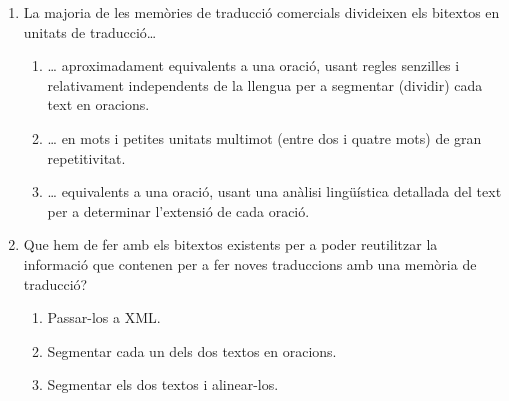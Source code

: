 \begin{enumerate}
\item La majoria de les memòries de traducció comercials divideixen
      els bitextos en unitats de traducció{\ldots}
   
\begin{enumerate}
\item {\ldots} aproximadament equivalents a una oració, usant
      regles senzilles i relativament independents de la llengua per a
      segmentar (dividir) cada text en oracions.
\item {\ldots} en mots i petites unitats multimot (entre dos i
      quatre mots) de gran repetitivitat.
\item {\ldots} equivalents a una oració, usant una anàlisi
      lingüística detallada del
      text per a determinar l'extensió de cada oració.
\end{enumerate}
\item Que hem de fer amb els bitextos existents per a poder reutilitzar la
   informació que contenen per a fer noves traduccions amb una memòria
   de traducció?
   
\begin{enumerate}
\item Passar-los a XML.
\item Segmentar cada un dels dos textos en oracions.
\item Segmentar els dos textos i alinear-los.
\end{enumerate}


\end{enumerate}

